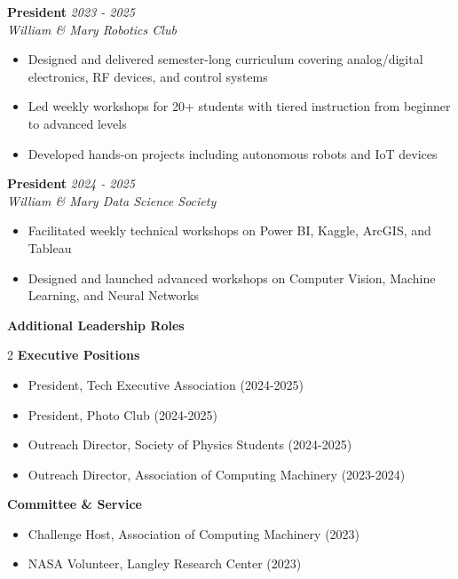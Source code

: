 \documentclass[11pt,letterpaper]{article}
\newcommand{\daterange}[1]{\textit{\color{secondary}#1}}
\newcommand{\position}[1]{\textbf{#1}}
\newcommand{\organization}[1]{\textit{#1}}
\begin{document}
\noindent
\position{President} \hfill \daterange{2023 - 2025}\\
\organization{William \& Mary Robotics Club}
\begin{itemize}
    \item Designed and delivered semester-long curriculum covering analog/digital electronics, RF devices, and control systems
    \item Led weekly workshops for 20+ students with tiered instruction from beginner to advanced levels
    \item Developed hands-on projects including autonomous robots and IoT devices
\end{itemize}

\vspace{8pt}
\noindent
\position{President} \hfill \daterange{2024 - 2025}\\
\organization{William \& Mary Data Science Society}
\begin{itemize}
    \item Facilitated weekly technical workshops on Power BI, Kaggle, ArcGIS, and Tableau
    \item Designed and launched advanced workshops on Computer Vision, Machine Learning, and Neural Networks
\end{itemize}

\vspace{8pt}
\noindent
\textbf{Additional Leadership Roles}

\vspace{4pt}
\begin{multicols}{2}
\noindent\textbf{Executive Positions}
\begin{itemize}
    \item President, Tech Executive Association (2024-2025)
    \item President, Photo Club (2024-2025)
    \item Outreach Director, Society of Physics Students (2024-2025)
    \item Outreach Director, Association of Computing Machinery (2023-2024)
\end{itemize}

\columnbreak

\noindent\textbf{Committee \& Service}
\begin{itemize}
    \item Challenge Host, Association of Computing Machinery (2023)
    \item NASA Volunteer, Langley Research Center (2023)
\end{itemize}
\end{multicols}
\end{document}
